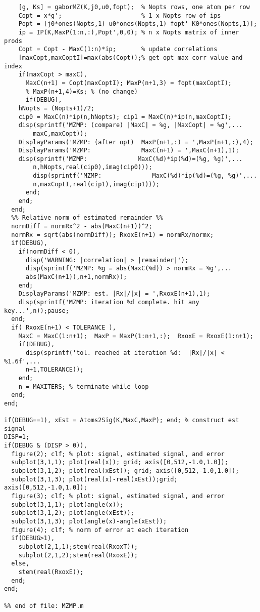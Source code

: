 \begin{verbatim}
    [g, Ks] = gaborMZ(K,j0,u0,fopt);  % Nopts rows, one atom per row
    Copt = x*g';                      % 1 x Nopts row of ips
    Popt = [j0*ones(Nopts,1) u0*ones(Nopts,1) fopt' K0*ones(Nopts,1)];
    ip = IP(K,MaxP(1:n,:),Popt',0,0); % n x Nopts matrix of inner prods
    Copt = Copt - MaxC(1:n)*ip;       % update correlations
    [maxCopt,maxCoptI]=max(abs(Copt));% get opt max corr value and index
    if(maxCopt > maxC),
      MaxC(n+1) = Copt(maxCoptI); MaxP(n+1,3) = fopt(maxCoptI); 
      % MaxP(n+1,4)=Ks; % (no change)
      if(DEBUG),
	hNopts = (Nopts+1)/2;
	cip0 = MaxC(n)*ip(n,hNopts); cip1 = MaxC(n)*ip(n,maxCoptI);
	disp(sprintf('MZMP: (compare) |MaxC| = %g, |MaxCopt| = %g',...
	    maxC,maxCopt));
	DisplayParams('MZMP: (after opt)  MaxP(n+1,:) = ',MaxP(n+1,:),4);
	DisplayParams('MZMP:              MaxC(n+1) = ',MaxC(n+1),1);
	disp(sprintf('MZMP:              MaxC(%d)*ip(%d)=(%g, %g)',...
	    n,hNopts,real(cip0),imag(cip0)));
        disp(sprintf('MZMP:              MaxC(%d)*ip(%d)=(%g, %g)',...
	    n,maxCoptI,real(cip1),imag(cip1)));
      end;
    end;
  end;
  %% Relative norm of estimated remainder %%
  normDiff = normRx^2 - abs(MaxC(n+1))^2;
  normRx = sqrt(abs(normDiff)); RxoxE(n+1) = normRx/normx;
  if(DEBUG),
    if(normDiff < 0),
      disp('WARNING: |correlation| > |remainder|');
      disp(sprintf('MZMP: %g = abs(MaxC(%d)) > normRx = %g',...
	  abs(MaxC(n+1)),n+1,normRx)); 
    end;
    DisplayParams('MZMP: est. |Rx|/|x| = ',RxoxE(n+1),1);    
    disp(sprintf('MZMP: iteration %d complete. hit any key...',n));pause;
  end;
  if( RxoxE(n+1) < TOLERANCE ),
    MaxC = MaxC(1:n+1);  MaxP = MaxP(1:n+1,:);  RxoxE = RxoxE(1:n+1); 
    if(DEBUG),
      disp(sprintf('tol. reached at iteration %d:  |Rx|/|x| < %1.6f',...
	  n+1,TOLERANCE));
    end;
    n = MAXITERS; % terminate while loop
  end;
end;

if(DEBUG==1), xEst = Atoms2Sig(K,MaxC,MaxP); end; % construct est signal
DISP=1;
if(DEBUG & (DISP > 0)),
  figure(2); clf; % plot: signal, estimated signal, and error
  subplot(3,1,1); plot(real(x)); grid; axis([0,512,-1.0,1.0]);
  subplot(3,1,2); plot(real(xEst)); grid; axis([0,512,-1.0,1.0]);
  subplot(3,1,3); plot(real(x)-real(xEst));grid; axis([0,512,-1.0,1.0]);
  figure(3); clf; % plot: signal, estimated signal, and error
  subplot(3,1,1); plot(angle(x));
  subplot(3,1,2); plot(angle(xEst));
  subplot(3,1,3); plot(angle(x)-angle(xEst));
  figure(4); clf; % norm of error at each iteration
  if(DEBUG>1),
    subplot(2,1,1);stem(real(RxoxT));
    subplot(2,1,2);stem(real(RxoxE));
  else,
    stem(real(RxoxE));
  end;
end;

%% end of file: MZMP.m
\end{verbatim}

